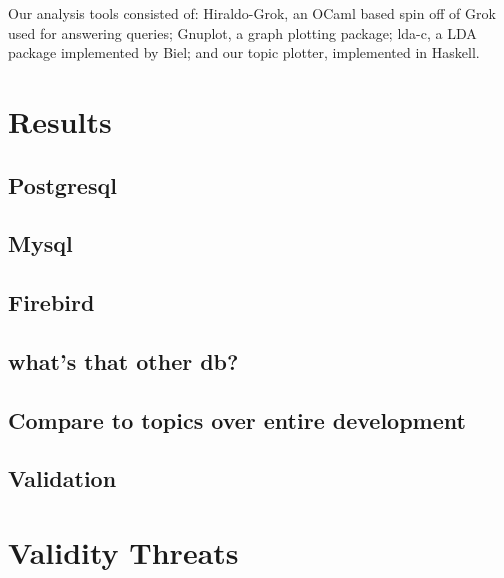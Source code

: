 \documentclass[times, 10pt,twocolumn]{article}
\begin{document}
Our analysis tools consisted of: Hiraldo-Grok, an OCaml based spin off
of Grok used for answering queries; Gnuplot, a graph plotting package;
lda-c, a LDA package implemented by Biel; and our topic plotter,
implemented in Haskell.















\section{Results}
\subsection{Postgresql}
\subsection{Mysql}
\subsection{Firebird}
\subsection{ what's that other db?}

\subsection{Compare to topics over entire development}

\subsection{Validation}


\section{Validity Threats}
\end{document}

